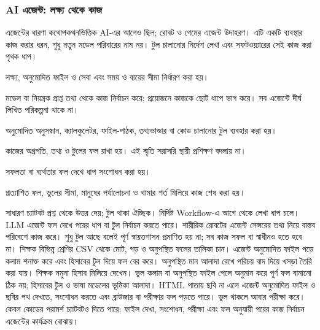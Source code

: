 \subsubsection{AI এজেন্ট: লক্ষ্য থেকে কাজ}
এজেন্টের ধারণা কথোপকথনভিত্তিক AI-এর আগেও ছিল; রোবট ও গেমের এজেন্ট উদাহরণ। এটি একটি ব্যবস্থার কাজ করার ধরন, শুধু নতুন মডেল পরিবারের নাম নয়। টুল চালানোর নির্দেশ লেখা এবং সফটওয়্যারের সেই কাজ করা পৃথক ধাপ।
\begin{compactenum}
\item লক্ষ্য, অনুমোদিত ফাইল ও সেবা এবং সময় ও ব্যয়ের সীমা নির্ধারণ করা হয়।
\item মডেল বা নিয়ন্ত্রক প্রাপ্ত তথ্য থেকে কাজ নির্বাচন করে; প্রয়োজনে কাজকে ছোট ধাপে ভাগ করে। সব এজেন্টে দীর্ঘ লিখিত পরিকল্পনা থাকে না।
\item অনুমোদিত অনুসন্ধান, ক্যালকুলেটর, ফাইল-পাঠক, তথ্যভান্ডার বা কোড চালানোর টুল ব্যবহার করা হয়।
\item কাজের অগ্রগতি, তথ্য ও টুলের ফল রাখা হয়। এই স্মৃতি সরাসরি স্থায়ী প্রশিক্ষণ বদলায় না।
\item সফলতা বা ব্যর্থতার ফল দেখে ধাপ সংশোধন করা হয়।
\item প্রত্যাশিত ফল, ভুলের সীমা, মানুষের পর্যালোচনা ও থামার শর্ত মিলিয়ে কাজ শেষ করা হয়।
\end{compactenum}
সাধারণ চ্যাটবট প্রশ্ন থেকে উত্তর দেয়; টুল থাকা ঐচ্ছিক। নির্দিষ্ট Workflow-এ আগে থেকে লেখা ধাপ চলে। LLM এজেন্ট ফল দেখে পরের ধাপ বা টুল নির্বাচন করতে পারে। শারীরিক রোবটের এজেন্ট সেন্সরের তথ্য নিয়ে বাস্তব পরিবেশে কাজ করে। শুধু টুল আছে বলেই পূর্ণ স্বায়ত্তশাসন প্রমাণিত হয় না; সব কাজ সফল বা স্বাধীনও হতে হবে না।
শিক্ষক বিভিন্ন শ্রেণির CSV থেকে মোট, গড় ও অনুপস্থিত ফলের তালিকা চান। এজেন্ট অনুমোদিত ফাইল পড়ে কলাম শনাক্ত করে এবং হিসাবের টুল দিয়ে ফল বের করে। অনুপস্থিত মান আলাদা রেখে পরিচয় বাদ দিয়ে খসড়া তৈরি করা যায়। শিক্ষক নমুনা হিসাব মিলিয়ে দেখেন। ভুল কলাম বা অনুপস্থিত ফাইল পেলে অনুমান করে পূর্ণ ফল বানানো ঠিক নয়; হিসাবের টুল ও ভাষা মডেলের ভূমিকা আলাদা।
HTML পাতায় ছবি না এলে এজেন্ট অনুমোদিত ফাইল ও ছবির পথ দেখতে, সংশোধন করতে এবং ব্রাউজার বা পরীক্ষার ফল পড়তে পারে। ভুল থাকলে আবার পরীক্ষা করে। কেবল কোডের পরামর্শ চ্যাটবটও দিতে পারে; ফাইল দেখা, সংশোধন, পরীক্ষা এবং ফল অনুযায়ী পরের কাজ নির্বাচন এজেন্টের কার্যক্রম বোঝায়।
